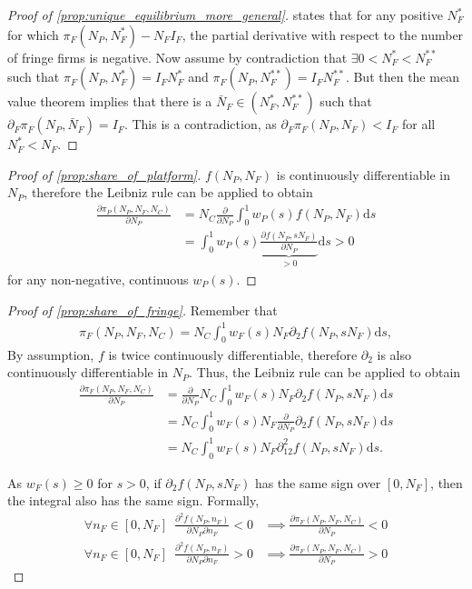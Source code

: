 \documentclass[a4paper]{article}
\newcommand{\ds}{\mathrm{d}s}
\begin{document}
\begin{proof}[Proof of \cref{prop:unique_equilibrium_more_general}]
     states that for any positive $N_F^*$ for which $\pi_F(N_P, N_F^*) - N_F I_F$, the partial derivative with respect to the number of fringe firms is negative.
    Now assume by contradiction that $\exists 0 < N_F^* < N_F^{**}$ such that $\pi_F(N_P, N_F^*) = I_F N_F^*$ and $\pi_F(N_P, N_F^{**}) = I_F N_F^{**}$.
    But then the mean value theorem implies that there is a $\bar{N}_F \in (N_F^*, N_F^{**})$ such that $\partial_F \pi_F(N_P, \bar{N}_F) = I_F$.
    This is a contradiction, as $\partial_F \pi_F(N_P, N_F) < I_F$ for all $N_F^* < N_F$.
\end{proof}

\begin{proof}[Proof of \cref{prop:share_of_platform}]
    $f(N_P, N_F)$ is continuously differentiable in $N_P$, therefore the Leibniz rule can be applied to obtain
    \begin{align*}
        \frac{\partial \pi_P(N_P, N_F, N_C)}{\partial N_P} &= N_C \frac{\partial}{\partial N_P} \int_0^1 w_P(s) f(N_P, N_F) \ds \\
        &= \int_0^1 w_P(s) \underbrace{\frac{\partial f(N_P, sN_F)}{\partial N_P}}_{> 0} \ds > 0
    \end{align*}
    for any non-negative, continuous $w_P(s)$.
\end{proof}

\begin{proof}[Proof of \cref{prop:share_of_fringe}]
    Remember that
    \begin{align*}
        \pi_F(N_P, N_F, N_C) = N_C \int_0^1 w_F(s) N_F \partial_2 f(N_P, s N_F) \ds,
    \end{align*}
    By assumption, $f$ is twice continuously differentiable, therefore $\partial_2$ is also continuously differentiable in $N_P$.
    Thus, the Leibniz rule can be applied to obtain
    \begin{align*}
        \frac{\partial \pi_F(N_P, N_F, N_C)}{\partial N_P} &= \frac{\partial}{\partial N_P} N_C \int_0^1 w_F(s) N_F \partial_2 f(N_P, s N_F) \ds \\
        &= N_C \int_0^1 w_F(s) N_F \frac{\partial}{\partial N_P} \partial_2 f(N_P, s N_F) \ds \\
        &= N_C \int_0^1 w_F(s) N_F \partial^2_{12} f(N_P, s N_F) \ds.
    \end{align*}

    As $w_F(s) \geq 0$ for $s > 0$, if $\partial_2 f(N_P, s N_F)$ has the same sign over $[0, N_F]$, then the integral also has the same sign.
    Formally,
    \begin{align*}
        \forall n_F \in [0, N_F] \enspace \frac{\partial^2 f(N_P, n_F)}{\partial N_P \partial n_F} < 0 &\implies \frac{\partial \pi_F(N_P, N_F, N_C)}{\partial N_P} < 0 \\
        \forall n_F \in [0, N_F] \enspace \frac{\partial^2 f(N_P, n_F)}{\partial N_P \partial n_F} > 0 &\implies \frac{\partial \pi_F(N_P, N_F, N_C)}{\partial N_P} > 0
    \end{align*}
\end{proof}
\end{document}
